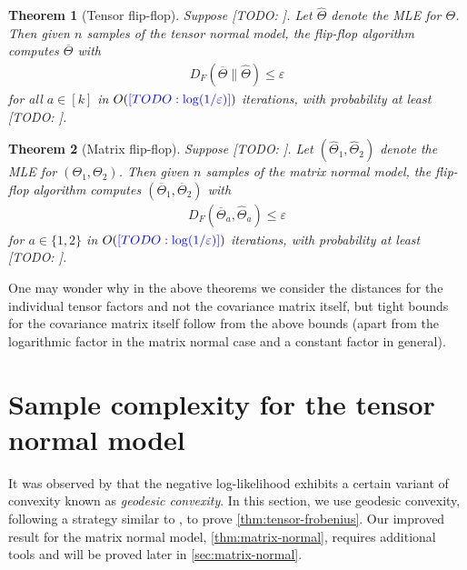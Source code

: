 \documentclass[aos]{imsart}
\newtheorem{theorem}{Theorem}[section]
\theoremstyle{definition}
\numberwithin{equation}{section}
\newcommand{\otheta}{\overline{\Theta}}
\newcommand{\htheta}{\widehat{\Theta}}
\newcommand{\eps}{\varepsilon}
\newcommand{\TODO}[1]{{\color{blue}[TODO: #1]}}
\begin{document}
\begin{theorem}[Tensor flip-flop]\label{thm:tensor-flipflop}
Suppose \TODO{}.
Let $\htheta$ denote the MLE for $\Theta$.
Then given $n$ samples of the tensor normal model, the flip-flop algorithm computes $\otheta$ with
\begin{align*}
  D_F(\otheta \rVert \htheta) \leq \eps
\end{align*}
for all $a\in[k]$ in $O(\TODO{\log(1/\eps)})$ iterations, with probability at least \TODO{}.
\end{theorem}

\begin{theorem}[Matrix flip-flop]\label{thm:matrix-flipflop}
Suppose \TODO{}.
Let $(\widehat{\Theta}_1,\widehat{\Theta}_2)$ denote the MLE for $(\Theta_1,\Theta_2)$.
Then given $n$ samples of the matrix normal model, the flip-flop algorithm computes $(\overline{\Theta}_1,\overline{\Theta}_2)$ with
\begin{align*}
  D_F(\overline{\Theta}_a, \widehat{\Theta}_a) \leq \eps
\end{align*}
for $a\in\{1,2\}$ in $O(\TODO{\log(1/\eps)})$ iterations, with probability at least \TODO{}.
\end{theorem}

One may wonder why in the above theorems we consider the distances for the individual tensor factors and not the covariance matrix itself, but tight bounds for the covariance matrix itself follow from the above bounds (apart from the logarithmic factor in the matrix normal case and a constant factor in general).


\section{Sample complexity for the tensor normal model}\label{sec:tensor-normal}
It was observed by \cite{wiesel2012geodesic} that the negative log-likelihood exhibits a certain variant of convexity known as \emph{geodesic convexity}.
In this section, we use geodesic convexity, following a strategy similar to \cite{FM20}, to prove \cref{thm:tensor-frobenius}.
Our improved result for the matrix normal model, \cref{thm:matrix-normal}, requires additional tools and will
be proved later in \cref{sec:matrix-normal}.

\end{document}
